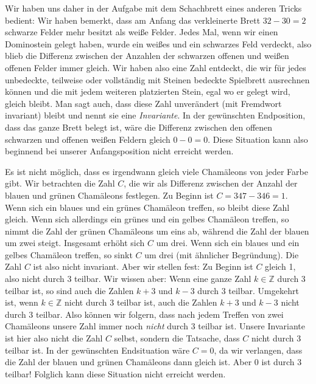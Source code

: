 \documentclass[a4paper,ngerman,12pt]{scrartcl}
\newcommand{\Z}{\mathbb{Z}}
\theoremstyle{definition}
\begin{document}
Wir haben uns daher in der Aufgabe mit dem Schachbrett eines anderen Tricks bedient: Wir haben bemerkt, dass am Anfang das verkleinerte Brett $32 - 30 = 2$ schwarze Felder mehr besitzt als weiße Felder. Jedes Mal, wenn wir einen Dominostein gelegt haben, wurde ein weißes und ein schwarzes Feld verdeckt, also blieb die Differenz zwischen der Anzahlen der schwarzen offenen und weißen offenen Felder immer gleich. Wir haben also eine Zahl entdeckt, die wir für jedes unbedeckte, teilweise oder vollständig mit Steinen bedeckte Spielbrett ausrechnen können und die mit jedem weiteren platzierten Stein, egal wo er gelegt wird, gleich bleibt. Man sagt auch, dass diese Zahl unverändert (mit Fremdwort invariant) bleibt und nennt sie eine \emph{Invariante}. In der gewünschten Endposition, dass das ganze Brett belegt ist, wäre die Differenz zwischen den offenen schwarzen und offenen weißen Feldern gleich $0 - 0 = 0$. Diese Situation kann also beginnend bei unserer Anfangsposition nicht erreicht werden.

\begin{antw}
  Es ist nicht möglich, dass es irgendwann gleich viele Chamäleons von jeder Farbe gibt. Wir betrachten die Zahl $C$, die wir als Differenz zwischen der Anzahl der blauen und grünen Chamäleons festlegen. Zu Beginn ist $C = 347 - 346 = 1$. Wenn sich ein blaues und ein grünes Chamäleon treffen, so bleibt diese Zahl gleich. Wenn sich allerdings ein grünes und ein gelbes Chamäleon treffen, so nimmt die Zahl der grünen Chamäleons um eins ab, während die Zahl der blauen um zwei steigt. Insgesamt erhöht sich $C$ um drei. Wenn sich ein blaues und ein gelbes Chamäleon treffen, so sinkt $C$ um drei (mit ähnlicher Begründung). Die Zahl $C$ ist also nicht invariant. Aber wir stellen fest: Zu Beginn ist $C$ gleich 1, also nicht durch 3 teilbar. Wir wissen aber: Wenn eine ganze Zahl $k \in \Z$ durch 3 teilbar ist, so sind auch die Zahlen $k + 3$ und $k - 3$ durch 3 teilbar. Umgekehrt ist, wenn $k \in \Z$ nicht durch 3 teilbar ist, auch die Zahlen $k + 3$ und $k - 3$ nicht durch 3 teilbar. Also können wir folgern, dass nach jedem Treffen von zwei Chamäleons unsere Zahl immer noch \emph{nicht} durch 3 teilbar ist. Unsere Invariante ist hier also nicht die Zahl $C$ selbst, sondern die Tatsache, dass $C$ nicht durch 3 teilbar ist. In der gewünschten Endsituation wäre $C = 0$, da wir verlangen, dass die Zahl der blauen und grünen Chamäleons dann gleich ist. Aber 0 ist durch 3 teilbar! Folglich kann diese Situation nicht erreicht werden.
\end{antw}
\end{document}
